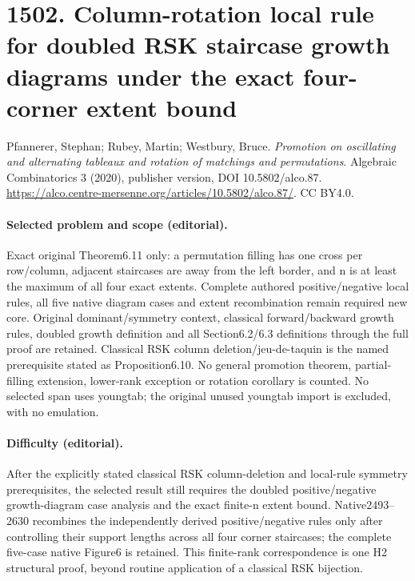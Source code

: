 \documentclass[10pt]{article}
\theoremstyle{definition}
\begin{document}
\section*{1502. Column-rotation local rule for doubled RSK staircase growth diagrams under the exact four-corner extent bound}
Pfannerer, Stephan; Rubey, Martin; Westbury, Bruce. \emph{Promotion on oscillating and alternating tableaux and rotation of matchings and permutations}. Algebraic Combinatorics 3 (2020), publisher version, DOI 10.5802/alco.87. \url{https://alco.centre-mersenne.org/articles/10.5802/alco.87/}. CC BY4.0.
\paragraph{Selected problem and scope (editorial).} Exact original Theorem6.11 only: a permutation filling has one cross per row/column, adjacent staircases are away from the left border, and n is at least the maximum of all four exact extents. Complete authored positive/negative local rules, all five native diagram cases and extent recombination remain required new core. Original dominant/symmetry context, classical forward/backward growth rules, doubled growth definition and all Section6.2/6.3 definitions through the full proof are retained. Classical RSK column deletion/jeu-de-taquin is the named prerequisite stated as Proposition6.10. No general promotion theorem, partial-filling extension, lower-rank exception or rotation corollary is counted. No selected span uses youngtab; the original unused youngtab import is excluded, with no emulation.
\paragraph{Difficulty (editorial).} After the explicitly stated classical RSK column-deletion and local-rule symmetry prerequisites, the selected result still requires the doubled positive/negative growth-diagram case analysis and the exact finite-n extent bound. Native2493–2630 recombines the independently derived positive/negative rules only after controlling their support lengths across all four corner staircases; the complete five-case native Figure6 is retained. This finite-rank correspondence is one H2 structural proof, beyond routine application of a classical RSK bijection.
\end{document}
